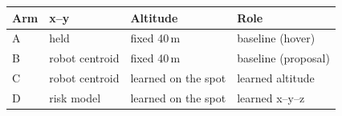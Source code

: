 \begin{tabular}{@{}llll@{}}
\toprule
Arm & x--y & Altitude & Role \\
\midrule
A & held & fixed 40\,m & baseline (hover) \\
B & robot centroid & fixed 40\,m & baseline (proposal) \\
C & robot centroid & learned on the spot & learned altitude \\
D & risk model & learned on the spot & learned x--y--z \\
\bottomrule
\end{tabular}
